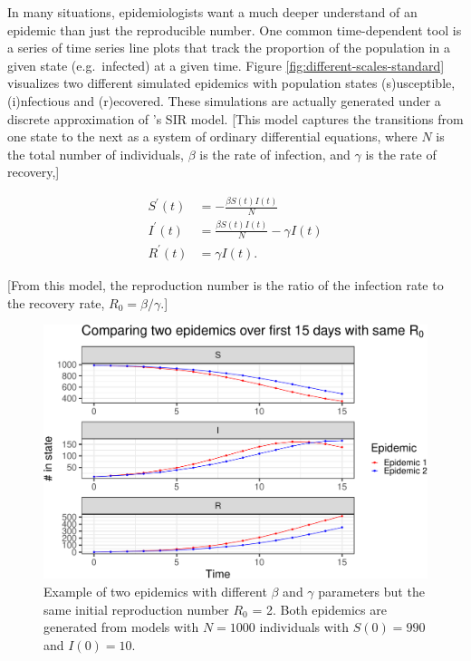 \documentclass[
  shortnames]{jss}
\begin{document}
In many situations, epidemiologists want a much deeper understand of an
epidemic than just the reproducible number. One common time-dependent
tool is a series of time series line plots that track the proportion of
the population in a given state (e.g.~infected) at a given time. Figure
\ref{fig:different-scales-standard} visualizes two different simulated
epidemics with population states (s)usceptible, (i)nfectious and
(r)ecovered. These simulations are actually generated under a discrete
approximation of \citet{Kermack1927}'s SIR model. {[}This model captures
the transitions from one state to the next as a system of ordinary
differential equations, where \(N\) is the total number of individuals,
\(\beta\) is the rate of infection, and \(\gamma\) is the rate of
recovery,{]}

\begin{align}\label{eq:sir-ode}
    S^\prime(t) &= -\frac{\beta S(t)I(t)}{N} \\
    I^\prime(t) &= \frac{\beta S(t)I(t)}{N} - \gamma I(t) \nonumber\\
    R^\prime(t) &= \gamma I(t) \nonumber.
\end{align}

{[}From this model, the reproduction number is the ratio of the
infection rate to the recovery rate, \(R_0 = \beta/\gamma\).{]}

\begin{CodeChunk}
\begin{figure}[H]

{\centering \includegraphics{Figs/unnamed-chunk-2-1} 

}

\caption{\label{fig:different-scales-standard}Example of two epidemics with different $\beta$ and $\gamma$ parameters but the same initial reproduction number $R_0$ = 2.  Both epidemics are generated from models with $N= 1000$ individuals with $S(0) = 990$ and $I(0) = 10$.}\label{fig:unnamed-chunk-2}
\end{figure}
\end{CodeChunk}
\end{document}
